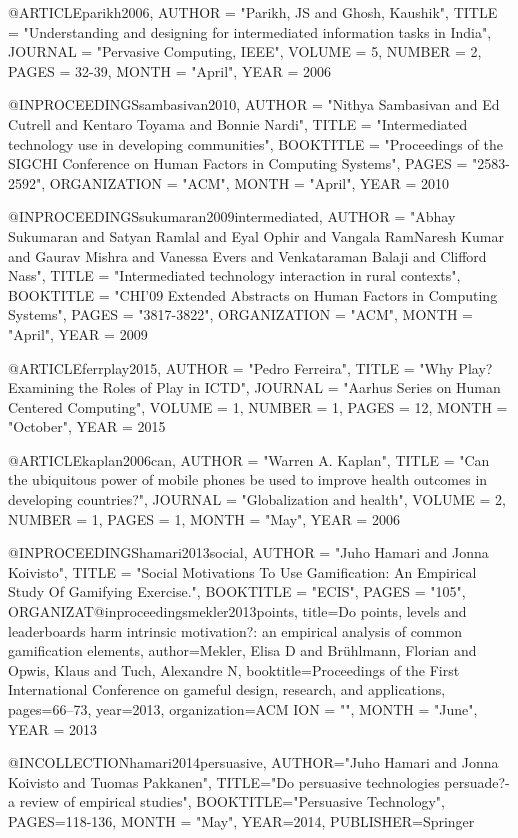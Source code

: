 @ARTICLE{parikh2006,
	AUTHOR = "Parikh, JS and Ghosh, Kaushik",
	TITLE = "Understanding and designing for intermediated information tasks in India",
	JOURNAL = "Pervasive Computing, IEEE",
	VOLUME = {5},
	NUMBER = {2},
	PAGES = {32-39},
	MONTH = "April",
	YEAR = {2006}	}

@INPROCEEDINGS{sambasivan2010,
	AUTHOR = "Nithya Sambasivan and Ed Cutrell and Kentaro Toyama and Bonnie Nardi",
	TITLE = "Intermediated technology use in developing communities",
	BOOKTITLE = "Proceedings of the SIGCHI Conference on Human Factors in Computing Systems",
	PAGES = "2583-2592",
	ORGANIZATION = "ACM",
	MONTH = "April", 
	YEAR = {2010}	}

@INPROCEEDINGS{sukumaran2009intermediated,
	AUTHOR = "Abhay Sukumaran and Satyan Ramlal and Eyal Ophir and Vangala RamNaresh Kumar and Gaurav Mishra and Vanessa Evers and  Venkataraman Balaji and Clifford Nass",
	TITLE = "Intermediated technology interaction in rural contexts",
	BOOKTITLE = "CHI'09 Extended Abstracts on Human Factors in Computing Systems",
	PAGES = "3817-3822",
	ORGANIZATION = "ACM",
	MONTH = "April", 
	YEAR = {2009}	}

@ARTICLE{ferrplay2015,
	AUTHOR = "Pedro Ferreira",
	TITLE = "Why Play? Examining the Roles of Play in ICTD",
	JOURNAL = "Aarhus Series on Human Centered Computing",
	VOLUME = {1},
	NUMBER = {1},
	PAGES = {12},
	MONTH = "October",
	YEAR = {2015}	}

@ARTICLE{kaplan2006can,
	AUTHOR = "Warren A. Kaplan",
	TITLE = "Can the ubiquitous power of mobile phones be used to improve health outcomes in developing countries?",
	JOURNAL = "Globalization and health",
	VOLUME = {2},
	NUMBER = {1},
	PAGES = {1},
	MONTH = "May",
	YEAR = {2006}	}

@INPROCEEDINGS{hamari2013social,
	AUTHOR = "Juho Hamari and Jonna Koivisto",
	TITLE = "Social Motivations To Use Gamification: An Empirical Study Of Gamifying Exercise.",
	BOOKTITLE = "ECIS",
	PAGES = "105",
	ORGANIZAT@inproceedings{mekler2013points,
  title={Do points, levels and leaderboards harm intrinsic motivation?: an empirical analysis of common gamification elements},
  author={Mekler, Elisa D and Br{\"u}hlmann, Florian and Opwis, Klaus and Tuch, Alexandre N},
  booktitle={Proceedings of the First International Conference on gameful design, research, and applications},
  pages={66--73},
  year={2013},
  organization={ACM}
}
ION = "",
	MONTH = "June", 
	YEAR = {2013}	}


@INCOLLECTION{hamari2014persuasive,
  AUTHOR="Juho Hamari and Jonna Koivisto and Tuomas Pakkanen",
  TITLE="Do persuasive technologies persuade?-a review of empirical studies",
  BOOKTITLE="Persuasive Technology",
  PAGES={118-136},
  MONTH = "May",
  YEAR={2014},
  PUBLISHER={Springer}
}

